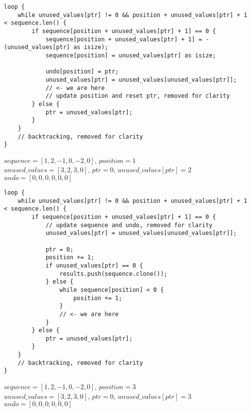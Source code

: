 \begin{frame}[fragile]
    \begin{verbatim}
loop {
    while unused_values[ptr] != 0 && position + unused_values[ptr] + 1 < sequence.len() {
        if sequence[position + unused_values[ptr] + 1] == 0 {
            sequence[position + unused_values[ptr] + 1] = -(unused_values[ptr] as isize);
            sequence[position] = unused_values[ptr] as isize;

            undo[position] = ptr;
            unused_values[ptr] = unused_values[unused_values[ptr]];
            // <- we are here
            // update position and reset ptr, removed for clarity
        } else {
            ptr = unused_values[ptr];
        }
    }
    // backtracking, removed for clarity
}
    \end{verbatim}
    $sequence = [1, 2, -1, 0, -2, 0]$, $position = 1$\\
    $unused\_values = [3, 2, 3, 0]$, $ptr = 0$, $unused\_values[ptr] = 2$\\
    $undo = [0, 0, 0, 0, 0, 0]$
\end{frame}
\begin{frame}[fragile]
    \begin{verbatim}
loop {
    while unused_values[ptr] != 0 && position + unused_values[ptr] + 1 < sequence.len() {
        if sequence[position + unused_values[ptr] + 1] == 0 {
            // update sequence and undo, removed for clarity
            unused_values[ptr] = unused_values[unused_values[ptr]];
            
            ptr = 0;
            position += 1;
            if unused_values[ptr] == 0 {
                results.push(sequence.clone());
            } else {
                while sequence[position] < 0 {
                    position += 1;
                }
                // <- we are here
            }
        } else {
            ptr = unused_values[ptr];
        }
    }
    // backtracking, removed for clarity
}
    \end{verbatim}
    $sequence = [1, 2, -1, 0, -2, 0]$, $position = 3$\\
    $unused\_values = [3, 2, 3, 0]$, $ptr = 0$, $unused\_values[ptr] = 3$\\
    $undo = [0, 0, 0, 0, 0, 0]$
\end{frame}
